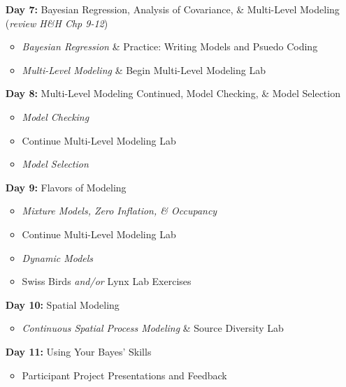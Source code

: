 \documentclass[11pt]{article}
\begin{document}
\begin{enumerate}
\item[\textbf{Day 7:}] Bayesian Regression, Analysis of Covariance, \& Multi-Level Modeling (\emph{review H\&H Chp 9-12})
\begin{itemize}
\item \emph{Bayesian Regression} \& Practice: Writing Models and Psuedo Coding %
\item \emph{Multi-Level Modeling} \& Begin Multi-Level Modeling Lab  %
\end{itemize}


\item[\textbf{Day 8:}] Multi-Level Modeling Continued, Model Checking, \& Model Selection

\begin{itemize}
\item \emph{Model Checking}%
\item  Continue Multi-Level Modeling Lab %
\item \emph{Model Selection}%
\end{itemize}

\item[\textbf{Day 9:}] Flavors of Modeling

\begin{itemize}
\item \emph{Mixture Models, Zero Inflation, \& Occupancy} %
\item  Continue Multi-Level Modeling Lab %
\item \emph{Dynamic Models}  %
\item Swiss Birds  \emph{and/or}  Lynx Lab Exercises
\end{itemize}

\newpage

\item[\textbf{Day 10:}] Spatial Modeling

\begin{itemize}
\item \emph{Continuous Spatial Process Modeling} \& Source Diversity Lab%
\end{itemize}

\item[\textbf{Day 11:}] Using Your Bayes' Skills

\begin{itemize}
\item Participant Project Presentations and Feedback 
\end{itemize}

\end{enumerate}
\end{document}
